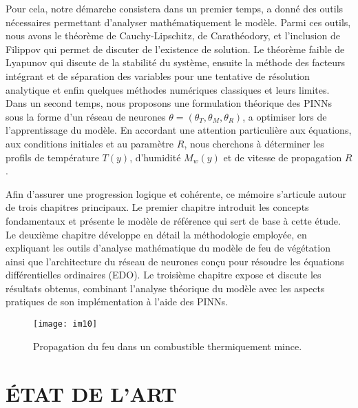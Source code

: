 \documentclass[12pt, oneside]{report} %
\theoremstyle{definition}
\theoremstyle{remark}
\begin{document}
Pour cela, notre démarche consistera dans un premier temps, a donné des outils nécessaires permettant d'analyser mathématiquement le modèle. Parmi ces outils, nous avons le théorème de Cauchy-Lipschitz, de Carathéodory, et l'inclusion de Filippov qui permet de discuter de l'existence de solution. Le théorème faible de Lyapunov qui discute de la stabilité du système, ensuite la méthode des facteurs intégrant et de séparation des variables pour une tentative de résolution analytique et enfin quelques méthodes numériques classiques et leurs limites. 
Dans un second temps, nous proposons une formulation théorique des PINNs sous la forme d'un réseau de neurones $\theta =(\theta_T, \theta_M, \theta_R)$, a optimiser lors de l'apprentissage du modèle. En accordant une attention particulière aux équations, aux conditions initiales et au paramètre $R$, nous cherchons à déterminer les profils de température $T(y)$, d'humidité $M_w(y)$ et de vitesse de propagation $R$.

Afin d'assurer une progression logique et cohérente, ce mémoire s'articule autour de trois chapitres principaux. Le premier chapitre introduit les concepts fondamentaux et présente le modèle de référence qui sert de base à cette étude. Le deuxième chapitre développe en détail la méthodologie employée, en expliquant les outils d'analyse mathématique du modèle de feu de végétation ainsi que l'architecture du réseau de neurones conçu pour résoudre les équations différentielles ordinaires (EDO). Le troisième chapitre expose et discute les résultats obtenus, combinant l'analyse théorique du modèle avec les aspects pratiques de son implémentation à l'aide des PINNs.
	\clearpage	
\begin{landscape}
	\thispagestyle{plain}
		\begin{figure}
		\centering
		\texttt{[image: im10]}
		\caption{Propagation du feu dans un combustible thermiquement mince.}
		\label{fig:im10}
	\end{figure}
\end{landscape}
	
	\clearpage
	
\part*{ÉTAT DE L'ART}
	\label{gen}	
			
\end{document}

